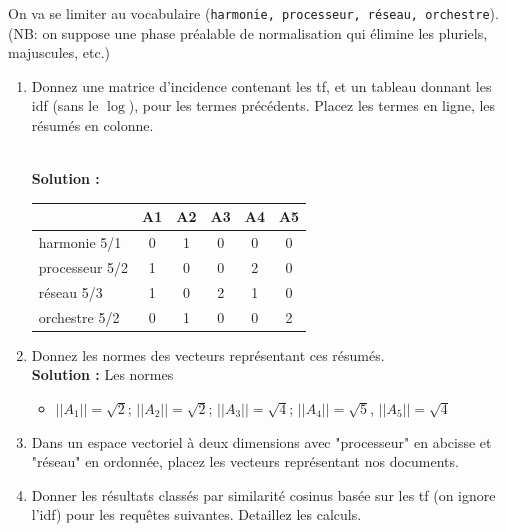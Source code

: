 \documentclass[11pt,a4paper]{article}
\newenvironment{solution}[0]{
~\\ \color{red} \textbf{Solution : }\color{black}}{%
}
\begin{document}
\bigskip

On va se limiter au vocabulaire (\texttt{harmonie, processeur, réseau, orchestre}).
(NB: on suppose
     une phase préalable de normalisation qui élimine les pluriels, majuscules, etc.)

\begin{enumerate}
   \item Donnez une matrice d'incidence contenant les tf,
      et un tableau donnant les idf (sans le $\log$), pour les  termes précédents. Placez
      les termes en ligne, les résumés en colonne.

\begin{solution}
\begin{center}
\begin{tabular}{l|c|c|c|c|c}
            & \textbf{A1} & \textbf{A2} & \textbf{A3} &\textbf{A4}&\textbf{A5} \\ \hline
   harmonie 5/1   & 0           & 1           & 0          & 0         & 0\\
   processeur  5/2  & 1           & 0           & 0           & 2        & 0\\
   réseau  5/3  & 1           & 0           & 2          & 1         & 0\\
   orchestre 5/2  & 0           & 1           & 0           & 0        & 2\\\hline
   \end{tabular}
\end{center}
\end{solution}

  \item Donnez les normes des vecteurs représentant ces résumés.
\begin{solution}
Les normes
\begin{itemize}
  \item $||A_1|| = \sqrt{2}$; $||A_2|| = \sqrt{2}$; $||A_3|| = \sqrt{4}$;
    $||A_4|| = \sqrt{5}$, $||A_5|| = \sqrt{4}$
\end{itemize}
\end{solution}

  \item Dans un espace vectoriel à deux dimensions avec "processeur" en abcisse
  et "réseau" en ordonnée, placez les vecteurs représentant nos documents.

  \item Donner les résultats classés par similarité cosinus basée sur les tf
  (on ignore l'idf) pour les requêtes suivantes. Detaillez les calculs.


\end{enumerate}
\end{document}
